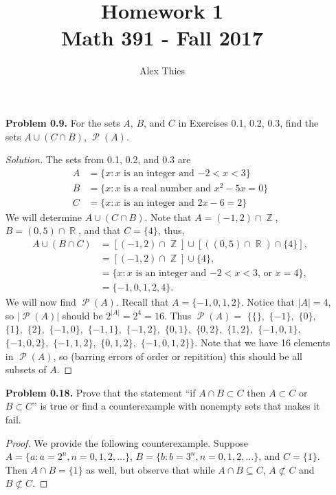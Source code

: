 \documentclass{amsart}
\author{Alex Thies}
\title{Homework 1 \\ Math 391 - Fall 2017}
\DeclareMathOperator{\Z}{\mathbb{Z}}
\DeclareMathOperator{\R}{\mathbb{R}}
\DeclareMathOperator{\pset}{\mathcal{P}}
\begin{document}
	\maketitle

	\begin{enumerate}
		\item[\textbf{Problem 0.9.}] For the sets $A$, $B$, and $C$ in Exercises 0.1, 0.2, 0.3, find the sets $A\cup(C \cap B)$, $\pset(A)$.
		\begin{proof}[Solution] The sets from 0.1, 0.2, and 0.3 are 
			\begin{align*}
				A &= \{x : \text{$x$ is an integer and $-2 < x < 3$}\} \\
				B &= \{x : \text{$x$ is a real number and $x^{2}-5x = 0$}\} \\
				C &= \{x : \text{$x$ is an integer and $2x - 6 = 2$}\}
			\end{align*}
			We will determine $A\cup(C \cap B)$.
			Note that $A = (-1, 2)\cap\Z$, $B = (0,5)\cap\R$, and that $C = \{ 4 \}$, thus,
			\begin{align*}
				A \cup (B \cap C) &= \left[ (-1, 2)\cap\Z \right] \cup \left[ \left( (0,5)\cap\R \right) \cap \{ 4 \} \right], \\
				&= \left[ (-1, 2)\cap\Z \right] \cup \{4\}, \\
				&= \{x : \text{$x$ is an integer and $-2 < x < 3$, or $x=4$}\}, \\
				&= \{-1, 0, 1, 2, 4\}.
			\end{align*}
			We will now find $\pset(A)$.
			Recall that $A = \{ -1, 0, 1, 2 \}$.
			Notice that $|A| = 4$, so $|\pset(A)|$ should be $2^{|A|} = 2^{4} = 16.$
			Thus $\pset(A) =$ $\{ \{\},$ $\{-1\},$ $\{0\},$ $\{1\},$ $\{2\},$ $\{-1,0\},$ $\{-1,1\},$ $\{-1,2\},$ $\{0,1\},$ $\{0,2\},$ $\{1,2\},$	$\{-1,0,1\},$ $\{-1,0,2\},$ $\{-1,1,2\},$ $\{0,1,2\},$ $\{-1,0,1,2\} \}$.
			Note that we have 16 elements in $\pset(A)$, so (barring errors of order or repitition) this should be all subsets of $A$.
		\end{proof}

		\item[\textbf{Problem 0.18.}] Prove that the statement ``if $A \cap B \subset C$ then $A \subset C$ or $B \subset C$'' is true or find a counterexample with nonempty sets that makes it fail.
		\begin{proof} We provide the following counterexample. 
		Suppose $A = \{a : a = 2^{n}, n=0,1,2,\dots \}$, $B = \{b : b = 3^{n}, n=0,1,2,\dots \}$, and $C = \{ 1 \}$.
		Then $A\cap B = \{ 1 \}$ as well, but observe that while $A\cap B \subseteq C$, $A \not\subset C$ and $B \not\subset C$.
		\end{proof}


\end{enumerate}
\end{document}
